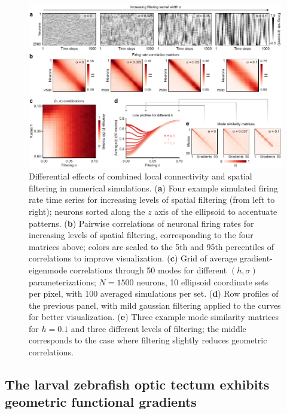 \documentclass{article}
\begin{document}
\begin{figure}[t]
    \centering
    \includegraphics[width=0.95\linewidth]{figures/figure5.pdf}
    \caption{Differential effects of combined local connectivity and spatial filtering in numerical simulations. (\textbf{a}) Four example simulated firing rate time series for increasing levels of spatial filtering (from left to right); neurons sorted along the $z$ axis of the ellipsoid to accentuate patterns. (\textbf{b}) Pairwise correlations of neuronal firing rates for increasing levels of spatial filtering, corresponding to the four matrices above; colors are scaled to the 5th and 95th percentiles of correlations to improve visualization. (\textbf{c}) Grid of average gradient-eigenmode correlations through 50 modes for different $(h,\sigma)$ parameterizations; $N=1500$ neurons, 10 ellipsoid coordinate sets per pixel, with 100 averaged simulations per set. (\textbf{d}) Row profiles of the previous panel, with mild gaussian filtering applied to the curves for better visualization. (\textbf{e}) Three example mode similarity matrices for $h=0.1$ and three different levels of filtering; the middle corresponds to the case where filtering slightly reduces geometric correlations.}
    \label{fig5}
    \hrulefill
\end{figure}

\subsection*{The larval zebrafish optic tectum exhibits geometric functional gradients}
\end{document}
